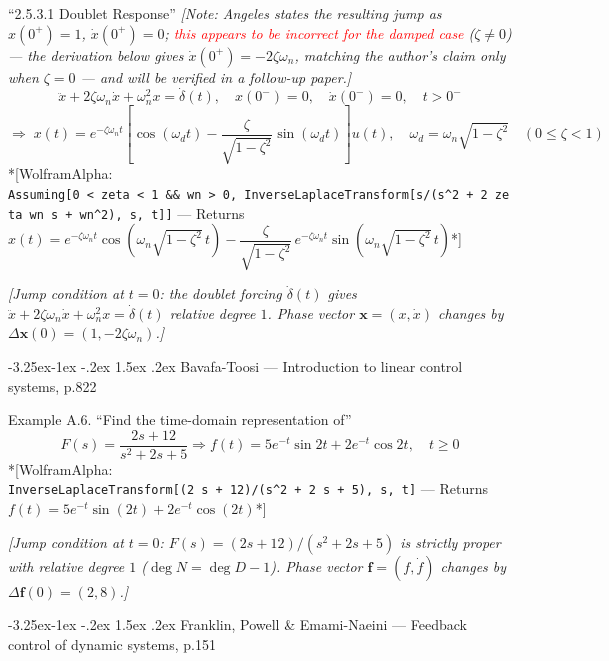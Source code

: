 \documentclass[
  11pt,
]{article}
\makeatletter
\providecommand{\implies}{\Longrightarrow}
\renewcommand\paragraph{\@startsection{paragraph}{4}{\z@}%
                                     {-3.25ex\@plus -1ex \@minus -.2ex}%
                                     {1.5ex \@plus .2ex}%
                                     {\normalfont\normalsize\bfseries}}
\makeatother
\begin{document}
``2.5.3.1 Doublet Response'' \emph{{[}Note: Angeles states the resulting
jump as \(x(0^+)=1\), \(\dot x(0^+)=0\);
\textcolor{red}{this appears to be incorrect for the damped case}
(\(\zeta\neq0\)) --- the derivation below gives
\(\dot x(0^+)=-2\zeta\omega_n\), matching the author's claim only when
\(\zeta=0\) --- and will be verified in a follow-up paper.{]}} \[
\ddot{x} + 2\zeta\omega_n\dot{x} + \omega_n^2 x = \dot{\delta}(t), \quad x(0^-) = 0, \quad \dot{x}(0^-) = 0, \quad t > 0^-
\] \[
\implies\; x(t) = e^{-\zeta\omega_n t}\left[\cos(\omega_d t) - \frac{\zeta}{\sqrt{1-\zeta^2}}\sin(\omega_d t)\right] u(t), \quad \omega_d = \omega_n\sqrt{1-\zeta^2} \quad (0\le\zeta<1)
\] *{[}WolframAlpha:
\texttt{Assuming{[}0\ \textless{}\ zeta\ \textless{}\ 1\ \&\&\ wn\ \textgreater{}\ 0,\ InverseLaplaceTransform{[}s/(s\^{}2\ +\ 2\ zeta\ wn\ s\ +\ wn\^{}2),\ s,\ t{]}{]}}
--- Returns
\(x(t) = e^{-\zeta\omega_n t}\cos\left(\omega_n\sqrt{1-\zeta^2}\,t\right) - \dfrac{\zeta}{\sqrt{1-\zeta^2}}\, e^{-\zeta\omega_n t}\sin\left(\omega_n\sqrt{1-\zeta^2}\,t\right)\)*{]}

\emph{{[}Jump condition at \(t=0\): the doublet forcing
\(\dot\delta(t)\) gives
\(\ddot x+2\zeta\omega_n\dot x+\omega_n^2x=\dot\delta(t)\) relative
degree \(1\). Phase vector \(\mathbf x=(x,\dot x)\) changes by
\(\Delta\mathbf x(0)=(1,-2\zeta\omega_n)\).{]}}

\hypertarget{bavafa-toosi-introduction-to-linear-control-systems-p.822}{%
\paragraph{Bavafa-Toosi --- Introduction to linear control systems,
p.822}\label{bavafa-toosi-introduction-to-linear-control-systems-p.822}}

Example A.6. ``Find the time-domain representation of'' \[
F(s) = \frac{2s + 12}{s^2 + 2s + 5} \implies f(t) = 5e^{-t}\sin 2t + 2e^{-t}\cos 2t, \quad t \geq 0
\] *{[}WolframAlpha:
\texttt{InverseLaplaceTransform{[}(2\ s\ +\ 12)/(s\^{}2\ +\ 2\ s\ +\ 5),\ s,\ t{]}}
--- Returns \(f(t) = 5 e^{-t}\sin(2t) + 2 e^{-t}\cos(2t)\)*{]}

\emph{{[}Jump condition at \(t=0\): \(F(s)=(2s+12)/(s^2+2s+5)\) is
strictly proper with relative degree \(1\) (\(\deg N=\deg D-1\)). Phase
vector \(\mathbf f=(f,\dot f)\) changes by
\(\Delta\mathbf f(0)=(2,8)\).{]}}

\hypertarget{franklin-powell-emami-naeini-feedback-control-of-dynamic-systems-p.151}{%
\paragraph{Franklin, Powell \& Emami-Naeini --- Feedback control of
dynamic systems,
p.151}\label{franklin-powell-emami-naeini-feedback-control-of-dynamic-systems-p.151}}
\end{document}
